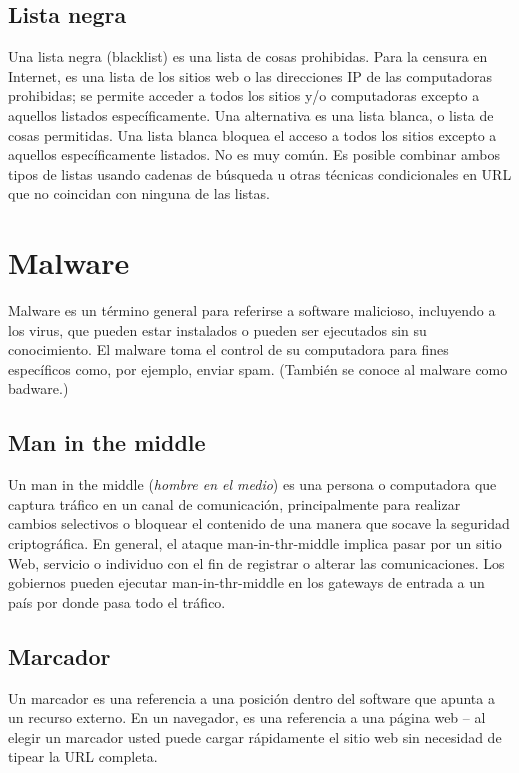 \subsection{Lista negra}\label{lista-negra}

Una lista negra (blacklist) es una lista de cosas prohibidas. Para la
censura en Internet, es una lista de los sitios web o las direcciones IP
de las computadoras prohibidas; se permite acceder a todos los sitios
y/o computadoras excepto a aquellos listados específicamente. Una
alternativa es una lista blanca, o lista de cosas permitidas. Una lista
blanca bloquea el acceso a todos los sitios excepto a aquellos
específicamente listados. No es muy común. Es posible combinar ambos
tipos de listas usando cadenas de búsqueda u otras técnicas
condicionales en URL que no coincidan con ninguna de las listas.

\section{Malware}\label{malware}

Malware es un término general para referirse a software malicioso,
incluyendo a los virus, que pueden estar instalados o pueden ser
ejecutados sin su conocimiento. El malware toma el control de su
computadora para fines específicos como, por ejemplo, enviar spam.
(También se conoce al malware como badware.)

\subsection{Man in the middle}\label{man-in-the-middle}

Un man in the middle (\emph{hombre en el medio}) es una persona o
computadora que captura tráfico en un canal de comunicación,
principalmente para realizar cambios selectivos o bloquear el contenido
de una manera que socave la seguridad criptográfica. En general, el
ataque man-in-thr-middle implica pasar por un sitio Web, servicio o
individuo con el fin de registrar o alterar las comunicaciones. Los
gobiernos pueden ejecutar man-in-thr-middle en los gateways de entrada a
un país por donde pasa todo el tráfico.

\subsection{Marcador}\label{marcador}

Un marcador es una referencia a una posición dentro del software que
apunta a un recurso externo. En un navegador, es una referencia a una
página web -- al elegir un marcador usted puede cargar rápidamente el
sitio web sin necesidad de tipear la URL completa.

